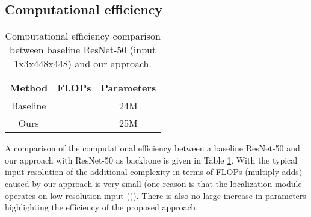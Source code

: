 \documentclass[10pt,twocolumn,letterpaper]{article}
\begin{document}
\subsection{Computational efficiency}
\begin{table}
  \begin{center}
  \begin{tabular} {|c|c|c|}
    \hline
    Method & FLOPs & Parameters  \\
    \hline
    \hline
    Baseline  &  & 24M \\
    Ours      &   & 25M \\
    \hline
  \end{tabular}
  \end{center}
  \caption{Computational efficiency comparison between baseline ResNet-50 (input 1x3x448x448) and our approach.}
  \label{table:complex}
\end{table}
A comparison of the computational efficiency between a baseline ResNet-50 and our approach with ResNet-50 as backbone is given in Table \ref{table:complex}. With the typical input resolution of  the additional complexity in terms of FLOPs (multiply-adds) caused by our approach is very small (one reason is that the localization module operates on low resolution input ()). There is also no large increase in parameters highlighting the efficiency of the proposed approach.
\end{document}
